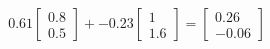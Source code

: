 \documentclass[preview]{standalone}
\begin{document}
\begin{align*}
0.61 \begin{bmatrix} 0.8 \\ 0.5 \end{bmatrix} + -0.23 \begin{bmatrix} 1 \\ 1.6 \end{bmatrix} = \begin{bmatrix} 0.26 \\ -0.06 \end{bmatrix}
\end{align*}
\end{document}
